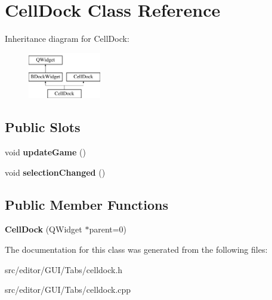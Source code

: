 \hypertarget{class_cell_dock}{\section{\-Cell\-Dock \-Class \-Reference}
\label{class_cell_dock}
}
\-Inheritance diagram for \-Cell\-Dock\-:\begin{figure}[H]
\begin{center}
\leavevmode
\includegraphics[height=2.000000cm]{class_cell_dock}
\end{center}
\end{figure}
\subsection*{\-Public \-Slots}
\begin{DoxyCompactItemize}
\item 
\hypertarget{class_cell_dock_ac33251ff749bac9ec9bc85ae84eefd78}{void {\bfseries update\-Game} ()}\label{class_cell_dock_ac33251ff749bac9ec9bc85ae84eefd78}

\item 
\hypertarget{class_cell_dock_aa00bce4b3adaaf6d481f836b2e1a4f53}{void {\bfseries selection\-Changed} ()}\label{class_cell_dock_aa00bce4b3adaaf6d481f836b2e1a4f53}

\end{DoxyCompactItemize}
\subsection*{\-Public \-Member \-Functions}
\begin{DoxyCompactItemize}
\item 
\hypertarget{class_cell_dock_a7d5a1e2829fb7c9401a9f3ae7236dde4}{{\bfseries \-Cell\-Dock} (\-Q\-Widget $\ast$parent=0)}\label{class_cell_dock_a7d5a1e2829fb7c9401a9f3ae7236dde4}

\end{DoxyCompactItemize}


\-The documentation for this class was generated from the following files\-:\begin{DoxyCompactItemize}
\item 
src/editor/\-G\-U\-I/\-Tabs/celldock.\-h\item 
src/editor/\-G\-U\-I/\-Tabs/celldock.\-cpp\end{DoxyCompactItemize}
